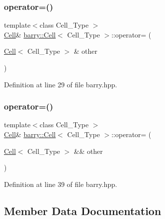 \subsubsection{\texorpdfstring{operator=()}{operator=()}\hspace{0.1cm}{\footnotesize\ttfamily [1/2]}}
{\footnotesize\ttfamily template$<$class Cell\+\_\+\+Type $>$ \\
\hyperlink{classbarry_1_1_cell}{Cell}\& \hyperlink{classbarry_1_1_cell}{barry\+::\+Cell}$<$ Cell\+\_\+\+Type $>$\+::operator= (\begin{DoxyParamCaption}\item[{\hyperlink{classbarry_1_1_cell}{Cell}$<$ Cell\+\_\+\+Type $>$ \&}]{other }\end{DoxyParamCaption})\hspace{0.3cm}{\ttfamily [inline]}}



Definition at line 29 of file barry.\+hpp.

\mbox{\label{classbarry_1_1_cell_ac0f00c52254617f8e4ba9d03ddf5b890}} 
\subsubsection{\texorpdfstring{operator=()}{operator=()}\hspace{0.1cm}{\footnotesize\ttfamily [2/2]}}
{\footnotesize\ttfamily template$<$class Cell\+\_\+\+Type $>$ \\
\hyperlink{classbarry_1_1_cell}{Cell}\& \hyperlink{classbarry_1_1_cell}{barry\+::\+Cell}$<$ Cell\+\_\+\+Type $>$\+::operator= (\begin{DoxyParamCaption}\item[{\hyperlink{classbarry_1_1_cell}{Cell}$<$ Cell\+\_\+\+Type $>$ \&\&}]{other }\end{DoxyParamCaption})\hspace{0.3cm}{\ttfamily [inline]}}



Definition at line 39 of file barry.\+hpp.



\subsection{Member Data Documentation}
\mbox{\label{classbarry_1_1_cell_a52918ded332c6a12109b5962d6bf3ae9}} 
